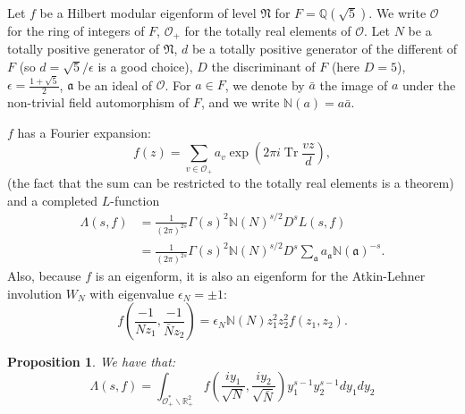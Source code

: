\documentclass{article}
\DeclareMathOperator{\Tr}{Tr}
\theoremstyle{plain}
\newtheorem{proposition}{Proposition}
\begin{document}
Let $f$ be a Hilbert modular eigenform of level $\mathfrak{N}$ for $F=\mathbb{Q}(\sqrt{5})$. We write $\mathcal{O}$ for the ring of integers of $F$, $\mathcal{O}_+$ for the totally real elements of $\mathcal{O}$. Let $N$ be a totally positive generator of $\mathfrak{N}$, $d$ be a totally positive generator of the different of $F$ (so $d=\sqrt{5}/\epsilon$ is a good choice), $D$ the discriminant of $F$ (here $D=5$), $\epsilon=\frac{1+\sqrt{5}}{2}$, $\mathfrak{a}$ be an ideal of $\mathcal{O}$. For $a \in F$, we denote by $\bar{a}$ the image of $a$ under the non-trivial field automorphism of $F$, and we write $\mathbb{N}(a)=a\bar{a}$. 

$f$ has a Fourier expansion:
\begin{equation*}
f(z)=\sum_{v \in \mathcal{O}_+} a_v \exp\left(2\pi i\Tr \frac{v z}{d}\right),
\end{equation*}
(the fact that the sum can be restricted to the totally real elements is a theorem) and a completed $L$-function
\begin{align*}
\Lambda(s,f) & = \frac{1}{(2\pi)^{2s}} \Gamma(s)^2 \mathbb{N}(N)^{s/2} D^s L(s,f)\\
&= \frac{1}{(2\pi)^{2s}} \Gamma(s)^2 \mathbb{N}(N)^{s/2} D^s \sum_{\mathfrak{a}}a_{\mathfrak{a}}\mathbb{N}(\mathfrak{a})^{-s}.
\end{align*}
Also, because $f$ is an eigenform, it is also an eigenform for the Atkin-Lehner involution $W_N$ with eigenvalue $\epsilon_N= \pm 1$:
\begin{equation*}
f\left(\frac{-1}{Nz_1},\frac{-1}{\bar{N}z_2} \right)=\epsilon_N \mathbb{N}(N)z_1^2z_2^2f(z_1, z_2).
\end{equation*}

\begin{proposition}
We have that:
\begin{equation*}
\Lambda(s,f)= \int_{\mathcal{O}_+^*\backslash \mathbb{R}^2_+} f\left(\frac{iy_1}{\sqrt{N}},\frac{iy_2}{\sqrt{\bar{N}}}\right) y_1^{s-1}y_2^{s-1} dy_1 dy_2
\end{equation*}
\end{proposition}
\end{document}
